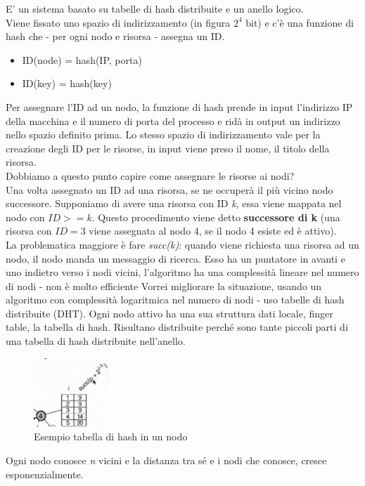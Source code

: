 \documentclass[12pt,italian]{report}
\begin{document}
\noindent E' un sistema basato su tabelle di hash distribuite e un anello logico. \\
Viene fissato uno spazio di indirizzamento (in figura $2^4$ bit) e c'è una funzione di hash che - per ogni nodo e risorsa - assegna un ID. 
\begin{itemize}
    \item ID(node) = hash(IP, porta)
    \item ID(key) = hash(key)
\end{itemize}
Per assegnare l'ID ad un nodo, la funzione di hash prende in input l'indirizzo IP della macchina e il numero di porta del processo e ridà in output un indirizzo nello spazio definito prima. Lo stesso spazio di indirizzamento vale per la creazione degli ID per le risorse, in input viene preso il nome, il titolo della risorsa. \\ Dobbiamo a questo punto capire come assegnare le risorse ai nodi? \\ Una volta assegnato un ID ad una risorsa, se ne occuperà il più vicino nodo successore. 
\bigbreak
Supponiamo di avere una risorsa con ID \textit{k}, essa viene mappata nel nodo con $ID >= k$. Questo procedimento viene detto \textbf{successore di k} (una risorsa con $ID = 3$ viene assegnata al nodo 4, se il nodo 4 esiste ed è attivo). \\
La problematica maggiore è fare \textit{succ(k)}: quando viene richiesta una risorsa ad un nodo, il nodo manda un messaggio di ricerca. Esso ha un puntatore in avanti e uno indietro verso i nodi vicini, l'algoritmo ha una complessità lineare nel numero di nodi - non è molto efficiente
\bigbreak
Vorrei migliorare la situazione, usando un algoritmo con complessità logaritmica nel numero di nodi - uso tabelle di hash distribuite (DHT). Ogni nodo attivo ha una sua struttura dati locale, finger table, la tabella di hash. Risultano distribuite perché sono tante piccoli parti di una tabella di hash distribuite nell'anello. 
\begin{figure}[h]
\centering
\includegraphics[width=30mm]{img/chordh.png}
\caption{Esempio tabella di hash in un nodo}
\label{fig:chorddh}
\end{figure}
\bigbreak
Ogni nodo conosce \textit{n} vicini e la distanza tra sé e i nodi che conosce, cresce esponenzialmente.
\end{document}
